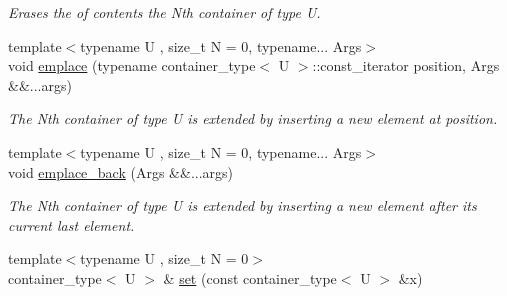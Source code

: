 \begin{DoxyCompactItemize}
\begin{DoxyCompactList}\small\item\em Erases the of contents the Nth container of type U. \end{DoxyCompactList}\item 
\hypertarget{classheterogeneous_1_1heterovector_3_01_t_00_01_types_8_8_8_4_a24086557e653f6f96393663eb5258c86}{}{\footnotesize template$<$typename U , size\+\_\+t N = 0, typename... Args$>$ }\\void \hyperlink{classheterogeneous_1_1heterovector_3_01_t_00_01_types_8_8_8_4_a24086557e653f6f96393663eb5258c86}{emplace} (typename container\+\_\+type$<$ U $>$\+::const\+\_\+iterator position, Args \&\&...args)\label{classheterogeneous_1_1heterovector_3_01_t_00_01_types_8_8_8_4_a24086557e653f6f96393663eb5258c86}

\begin{DoxyCompactList}\small\item\em The Nth container of type U is extended by inserting a new element at position. \end{DoxyCompactList}\item 
\hypertarget{classheterogeneous_1_1heterovector_3_01_t_00_01_types_8_8_8_4_a8b28864378ea45dd406e6a1daa746c10}{}{\footnotesize template$<$typename U , size\+\_\+t N = 0, typename... Args$>$ }\\void \hyperlink{classheterogeneous_1_1heterovector_3_01_t_00_01_types_8_8_8_4_a8b28864378ea45dd406e6a1daa746c10}{emplace\+\_\+back} (Args \&\&...args)\label{classheterogeneous_1_1heterovector_3_01_t_00_01_types_8_8_8_4_a8b28864378ea45dd406e6a1daa746c10}

\begin{DoxyCompactList}\small\item\em The Nth container of type U is extended by inserting a new element after its current last element. \end{DoxyCompactList}\item 
\hypertarget{classheterogeneous_1_1heterovector_3_01_t_00_01_types_8_8_8_4_a1204de5ebc6b18734b4f83c3a54287b0}{}{\footnotesize template$<$typename U , size\+\_\+t N = 0$>$ }\\container\+\_\+type$<$ U $>$ \& \hyperlink{classheterogeneous_1_1heterovector_3_01_t_00_01_types_8_8_8_4_a1204de5ebc6b18734b4f83c3a54287b0}{set} (const container\+\_\+type$<$ U $>$ \&x)\label{classheterogeneous_1_1heterovector_3_01_t_00_01_types_8_8_8_4_a1204de5ebc6b18734b4f83c3a54287b0}


\end{DoxyCompactItemize}
